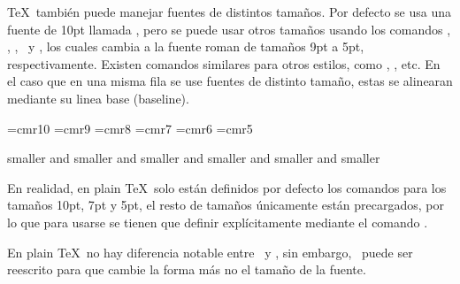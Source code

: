 \TeX\ también puede manejar fuentes de distintos tamaños. Por defecto se usa una fuente de 10pt llamada \texcs\tenrm, pero se puede usar otros tamaños usando los comandos \texcs\ninerm, \texcs\eightrm, \texcs\sevenrm, \texcs\sixrm\ y \texcs\fiverm, los cuales cambia a la fuente roman de tamaños 9pt a 5pt, respectivamente. Existen comandos similares para otros estilos, como \texcs\tensl, \texcs\ninesl, etc. En el caso que en una misma fila se use fuentes de distinto tamaño, estas se alinearan mediante su linea base (baseline).

{
\font\tenrm=cmr10  \font\ninerm=cmr9  \font\eightrm=cmr8
\font\sevenrm=cmr7  \font\sixrm=cmr6  \font\fiverm=cmr5
\begin{texexample}
  \tenrm smaller \ninerm and smaller
  \eightrm and smaller \sevenrm and smaller
  \sixrm and smaller \fiverm and smaller
\end{texexample}
}

\begin{notebox}
  En realidad, en plain \TeX\ solo están definidos por defecto los comandos para los tamaños 10pt, 7pt y 5pt, el resto de tamaños únicamente están precargados, por lo que para usarse se tienen que definir explícitamente mediante el comando \texcs\font.
\end{notebox}


En plain \TeX\ no hay diferencia notable entre \texcs\rm\ y \texcs\tenrm, sin embargo, \texcs\rm\ puede ser reescrito para que cambie la forma más no el tamaño de la fuente.


